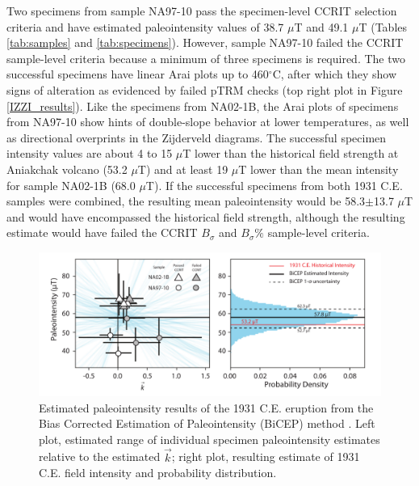 \documentclass[draft]{agujournal2019}
\begin{document}
Two specimens from sample NA97-10 pass the specimen-level CCRIT selection criteria and have estimated paleointensity values of 38.7 $\mu$T and 49.1 $\mu$T (Tables \ref{tab:samples} and \ref{tab:specimens}). However, sample NA97-10 failed the CCRIT sample-level criteria because a minimum of three specimens is required. The two successful specimens have linear Arai plots up to 460$^{\circ}$C, after which they show signs of alteration as evidenced by failed pTRM checks (top right plot in Figure \ref{IZZI_results}). Like the specimens from NA02-1B, the Arai plots of specimens from NA97-10 show hints of double-slope behavior at lower temperatures, as well as directional overprints in the Zijderveld diagrams. The successful specimen intensity values are about 4 to 15 $\mu$T lower than the historical field strength at Aniakchak volcano (53.2 $\mu$T) and at least 19 $\mu$T lower than the mean intensity for sample NA02-1B (68.0 $\mu$T). If the successful specimens from both 1931 C.E. samples were combined, the resulting mean paleointensity would be 58.3$\pm$13.7 $\mu$T and would have encompassed the historical field strength, although the resulting estimate would have failed the CCRIT $B_{\sigma}$ and $B_{\sigma} \%$ sample-level criteria.

\begin{figure}
\centering
\noindent\includegraphics[width=35pc]{../Figure/BiCEP_1931_all_092421.pdf}
\caption{Estimated paleointensity results of the 1931 C.E. eruption from the Bias Corrected Estimation of Paleointensity (BiCEP) method \cite{Cych2021a}. Left plot, estimated range of individual specimen paleointensity estimates relative to the estimated $\vec{k}$; right plot, resulting estimate of 1931 C.E. field intensity and probability distribution.}
\label{bicep_1931}
\end{figure}
\end{document}
